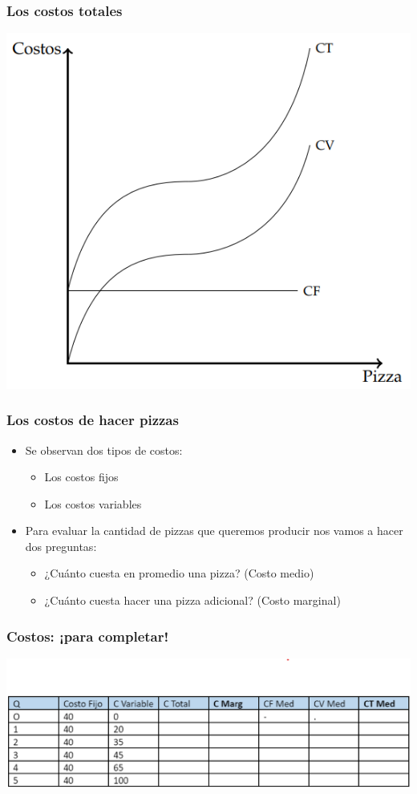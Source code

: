 \documentclass{beamer}
\begin{document}
\begin{frame}
\frametitle{Los costos totales}
\centering
\includegraphics[scale=0.6]{../Figures/C13.3.png}
\end{frame}

\begin{frame}
\frametitle{Los costos de hacer pizzas}
\begin{itemize}
    \item Se observan dos tipos de costos: 
        \begin{itemize}
        \item Los costos fijos
        \item Los costos variables
        \end{itemize}
    \vspace{2mm}
    \item Para evaluar la cantidad de pizzas que queremos producir nos vamos a hacer dos preguntas:
        \begin{itemize}
        \item ¿Cuánto cuesta en promedio una pizza? (Costo medio)
        \item ¿Cuánto cuesta hacer una pizza adicional? (Costo marginal)
        \end{itemize}
\end{itemize}
\end{frame}

\begin{frame}
\frametitle{Costos: ¡para completar! }
\centering
\includegraphics[scale=0.45]{../Figures/Tabla_Costos_Completar.png}
\end{frame}
\end{document}

